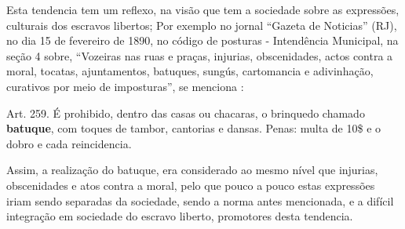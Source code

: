 Esta tendencia tem um reflexo, na visão que tem a sociedade sobre as expressões,
culturais dos escravos libertos; Por exemplo no jornal ``Gazeta de Noticias'' (RJ), 
no dia 15 de fevereiro de 1890,
no código de posturas - Intendência Municipal, 
na seção 4 sobre, 
``Vozeiras nas ruas e praças, injurias, obscenidades, 
actos contra a moral, tocatas, ajuntamentos, batuques, sungús, cartomancia e adivinhação,
curativos por meio de imposturas'', se menciona \cite[pp. 4]{batuqueperiodicogazetanoticias}:
\begin{citando}%
Art. 259. É prohibido, dentro das casas ou chacaras, o brinquedo chamado \textbf{batuque},
com toques de tambor, cantorias e dansas. Penas: multa de 10\$ e o dobro e cada reincidencia.
\end{citando}
Assim, a realização do batuque, era considerado ao mesmo nível que injurias, 
obscenidades e atos contra a moral, 
pelo que pouco a pouco estas expressões iriam sendo separadas da sociedade,
sendo a norma antes mencionada, e a difícil integração em sociedade do escravo liberto, 
promotores desta tendencia. 

